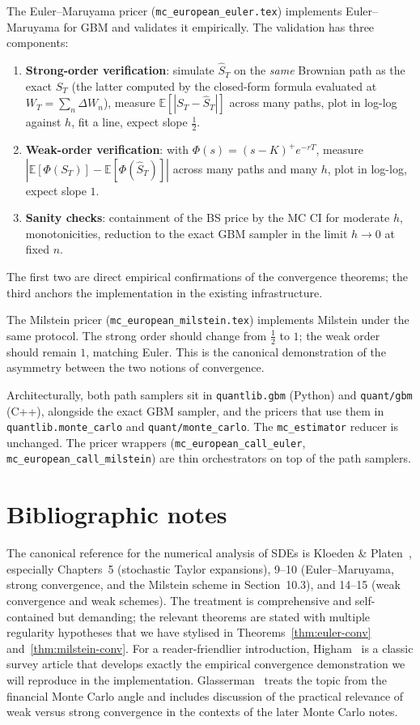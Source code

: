 \documentclass[11pt,a4paper]{article}
\theoremstyle{plain}
\theoremstyle{definition}
\theoremstyle{remark}
\newcommand{\E}{\mathbb{E}}
\begin{document}
The Euler--Maruyama pricer (\texttt{mc\_european\_euler.tex}) implements
Euler--Maruyama for GBM and validates it
empirically. The validation has three components:
\begin{enumerate}
\item \textbf{Strong-order verification}: simulate $\hat S_T$ on the
\emph{same} Brownian path as the exact $S_T$ (the latter computed by
the closed-form formula evaluated at $W_T = \sum_n \Delta W_n$),
measure $\E[|S_T - \hat S_T|]$ across many paths, plot in log-log
against $h$, fit a line, expect slope $\tfrac{1}{2}$.
\item \textbf{Weak-order verification}: with $\Phi(s) = (s - K)^+
e^{-rT}$, measure $|\E[\Phi(S_T)] - \E[\Phi(\hat S_T)]|$ across many
paths and many $h$, plot in log-log, expect slope $1$.
\item \textbf{Sanity checks}: containment of the BS price by the MC
CI for moderate $h$, monotonicities, reduction to the exact GBM
sampler in the limit $h \to 0$ at fixed $n$.
\end{enumerate}
The first two are direct empirical confirmations of the convergence
theorems; the third anchors the implementation in the existing
infrastructure.

The Milstein pricer (\texttt{mc\_european\_milstein.tex}) implements
Milstein under the same protocol. The
strong order should change from $\tfrac{1}{2}$ to $1$; the weak order
should remain $1$, matching Euler. This is the canonical demonstration
of the asymmetry between the two notions of convergence.

Architecturally, both path samplers sit in \texttt{quantlib.gbm}
(Python) and \texttt{quant/gbm} (C++), alongside the exact GBM sampler,
and the pricers that use them in \texttt{quantlib.monte\_carlo} and
\texttt{quant/monte\_carlo}. The
\texttt{mc\_estimator} reducer is unchanged. The pricer wrappers
(\texttt{mc\_european\_call\_euler}, \texttt{mc\_european\_call\_milstein})
are thin orchestrators on top of the path samplers.

\section{Bibliographic notes}
\label{sec:biblio}

The canonical reference for the numerical analysis of SDEs is
Kloeden \& Platen~\cite{KloedenPlaten}, especially Chapters~5
(stochastic Taylor expansions), 9--10 (Euler--Maruyama, strong
convergence, and the Milstein scheme in Section~10.3), and 14--15
(weak convergence and weak schemes). The treatment is comprehensive and self-contained but
demanding; the relevant theorems are stated with multiple regularity
hypotheses that we have stylised in Theorems~\ref{thm:euler-conv}
and~\ref{thm:milstein-conv}. For a reader-friendlier introduction,
Higham~\cite{Higham2001} is a classic survey article that develops
exactly the empirical convergence demonstration we will reproduce in
the implementation. Glasserman~\cite[Chapter~6]{Glasserman} treats
the topic from the financial Monte Carlo angle and includes
discussion of the practical relevance of weak versus strong
convergence in the contexts of the later Monte Carlo notes.
\end{document}
